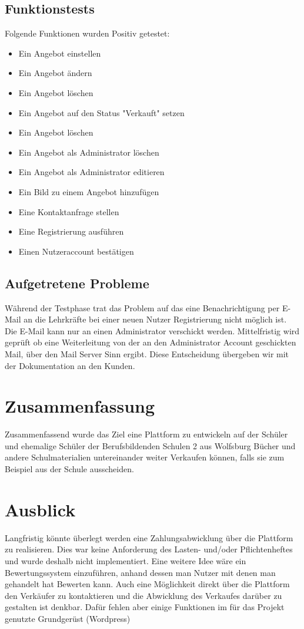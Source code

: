 \documentclass[a4paper, DIV20, 11pt, headsepline, parskip]{article}
\begin{document}
\subsection{Funktionstests}
Folgende Funktionen wurden Positiv getestet:
\begin{itemize}
\item Ein Angebot einstellen
\item Ein Angebot ändern
\item Ein Angebot löschen
\item Ein Angebot auf den Status "Verkauft" setzen
\item Ein Angebot löschen
\item Ein Angebot als Administrator löschen
\item Ein Angebot als Administrator editieren
\item Ein Bild zu einem Angebot hinzufügen
\item Eine Kontaktanfrage stellen
\item Eine Registrierung ausführen
\item Einen Nutzeraccount bestätigen
\end{itemize}
\subsection{Aufgetretene Probleme}
Während der Testphase trat das Problem auf das eine Benachrichtigung per E-Mail an die Lehrkräfte bei einer neuen Nutzer Registrierung nicht möglich ist.
Die E-Mail kann nur an einen Administrator verschickt werden.
Mittelfristig wird geprüft ob eine Weiterleitung von der an den Administrator Account geschickten Mail, über den Mail Server Sinn ergibt.
Diese Entscheidung übergeben wir mit der Dokumentation an den Kunden.
\section{Zusammenfassung}
Zusammenfassend wurde das Ziel eine Plattform zu entwickeln auf der Schüler und ehemalige Schüler der Berufsbildenden Schulen 2 aus Wolfsburg Bücher und andere Schulmaterialien untereinander weiter Verkaufen können, falls sie zum Beispiel aus der Schule ausscheiden.
\section{Ausblick}
Langfristig könnte überlegt werden eine Zahlungsabwicklung über die Plattform zu realisieren.
Dies war keine Anforderung des Lasten- und/oder Pflichtenheftes und wurde deshalb nicht implementiert.
Eine weitere Idee wäre ein Bewertungssystem einzuführen, anhand dessen man Nutzer mit denen man gehandelt hat Bewerten kann.
Auch eine Möglichkeit direkt über die Plattform den Verkäufer zu kontaktieren und die Abwicklung des Verkaufes darüber zu gestalten ist denkbar.
Dafür fehlen aber einige Funktionen im für das Projekt genutzte Grundgerüst (Wordpress)
\end{document}
